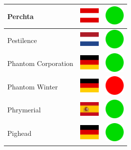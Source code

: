 \documentclass[12pt, a4paper, twoside]{report}
\begin{document}
\begin{center}
\begin{longtable}{|p{5cm}|p{2cm}|p{2cm}|}
 Perchta                                                    & \includegraphics[width=1cm]{../4x3/at} &   \includegraphics[width=1cm]{../likes/y} \\ \hline
 Pestilence                                                 & \includegraphics[width=1cm]{../4x3/nl} &   \includegraphics[width=1cm]{../likes/y} \\ \hline
 Phantom Corporation                                        & \includegraphics[width=1cm]{../4x3/de} &   \includegraphics[width=1cm]{../likes/y} \\ \hline
 Phantom Winter                                             & \includegraphics[width=1cm]{../4x3/de} &   \includegraphics[width=1cm]{../likes/n} \\ \hline
 Phrymerial                                                 & \includegraphics[width=1cm]{../4x3/es} &   \includegraphics[width=1cm]{../likes/y} \\ \hline
 Pighead                                                    & \includegraphics[width=1cm]{../4x3/de} &   \includegraphics[width=1cm]{../likes/y} \\ \hline

\end{longtable}
\end{center}
\end{document}

